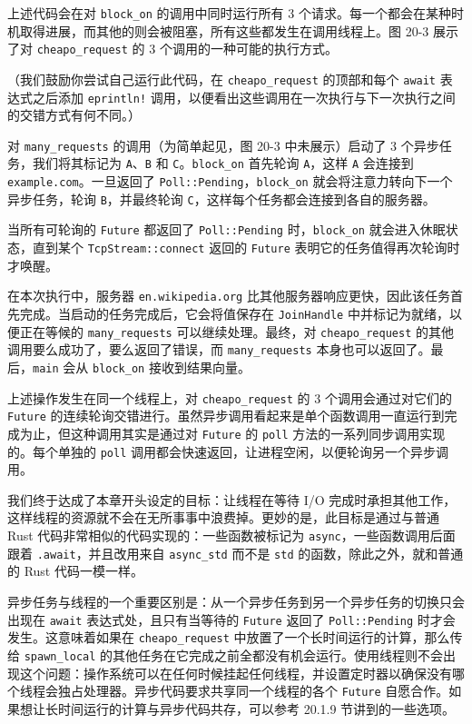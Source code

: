 上述代码会在对 \texttt{block\_on} 的调用中同时运行所有 3 个请求。每一个都会在某种时机取得进展，而其他的则会被阻塞，所有这些都发生在调用线程上。图 20-3 展示了对 \texttt{cheapo\_request} 的 3 个调用的一种可能的执行方式。


（我们鼓励你尝试自己运行此代码，在 \texttt{cheapo\_request} 的顶部和每个 \texttt{await} 表达式之后添加 \texttt{eprintln!} 调用，以便看出这些调用在一次执行与下一次执行之间的交错方式有何不同。）

对 \texttt{many\_requests} 的调用（为简单起见，图 20-3 中未展示）启动了 3 个异步任务，我们将其标记为 \texttt{A}、\texttt{B} 和 \texttt{C}。\texttt{block\_on} 首先轮询 \texttt{A}，这样 \texttt{A} 会连接到 \texttt{example.com}。一旦返回了 \texttt{Poll::Pending}，\texttt{block\_on} 就会将注意力转向下一个异步任务，轮询 \texttt{B}，并最终轮询 \texttt{C}，这样每个任务都会连接到各自的服务器。

当所有可轮询的 \texttt{Future} 都返回了 \texttt{Poll::Pending} 时，\texttt{block\_on} 就会进入休眠状态，直到某个 \texttt{TcpStream::connect} 返回的 \texttt{Future} 表明它的任务值得再次轮询时才唤醒。

在本次执行中，服务器 \texttt{en.wikipedia.org} 比其他服务器响应更快，因此该任务首先完成。当启动的任务完成后，它会将值保存在 \texttt{JoinHandle} 中并标记为就绪，以便正在等候的 \texttt{many\_requests} 可以继续处理。最终，对 \texttt{cheapo\_request} 的其他调用要么成功了，要么返回了错误，而 \texttt{many\_requests} 本身也可以返回了。最后，\texttt{main} 会从 \texttt{block\_on} 接收到结果向量。

上述操作发生在同一个线程上，对 \texttt{cheapo\_request} 的 3 个调用会通过对它们的 \texttt{Future} 的连续轮询交错进行。虽然异步调用看起来是单个函数调用一直运行到完成为止，但这种调用其实是通过对 \texttt{Future} 的 \texttt{poll} 方法的一系列同步调用实现的。每个单独的 \texttt{poll} 调用都会快速返回，让进程空闲，以便轮询另一个异步调用。

我们终于达成了本章开头设定的目标：让线程在等待 I/O 完成时承担其他工作，这样线程的资源就不会在无所事事中浪费掉。更妙的是，此目标是通过与普通 Rust 代码非常相似的代码实现的：一些函数被标记为 \texttt{async}，一些函数调用后面跟着 \texttt{.await}，并且改用来自 \texttt{async\_std} 而不是 \texttt{std} 的函数，除此之外，就和普通的 Rust 代码一模一样。

异步任务与线程的一个重要区别是：从一个异步任务到另一个异步任务的切换只会出现在 \texttt{await} 表达式处，且只有当等待的 \texttt{Future} 返回了 \texttt{Poll::Pending} 时才会发生。这意味着如果在 \texttt{cheapo\_request} 中放置了一个长时间运行的计算，那么传给 \texttt{spawn\_local} 的其他任务在它完成之前全都没有机会运行。使用线程则不会出现这个问题：操作系统可以在任何时候挂起任何线程，并设置定时器以确保没有哪个线程会独占处理器。异步代码要求共享同一个线程的各个 \texttt{Future} 自愿合作。如果想让长时间运行的计算与异步代码共存，可以参考 20.1.9 节讲到的一些选项。

